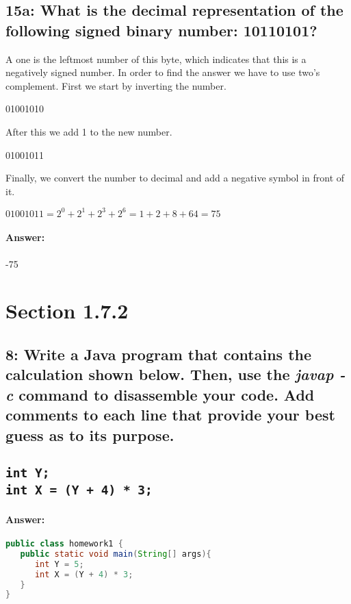 \documentclass[12pt]{article}
\newcommand\tab[1][1cm]{\hspace{#1}}
\begin{document}
\subsection*{15a: What is the decimal representation of the following signed binary number: 10110101?}
\tab A one is the leftmost number of this byte, which indicates that this is a negatively signed number. In order to find the answer we have to use two's complement. First we start by inverting the number. \\
\begin{center}
	01001010
\end{center}
After this we add 1 to the new number.
\begin{center}
	01001011
\end{center}
Finally, we convert the number to decimal and add a negative symbol in front of it. \\
\begin{center}
	$01001011 = 2^0 + 2^1 + 2^3 + 2^6 = 1 + 2 + 8 + 64 = 75$
\end{center}
\paragraph*{Answer:} -75 

\section*{Section 1.7.2}
\subsection*{8: Write a Java program that contains the calculation shown below. Then, use the \textit{javap -c} command to disassemble your code. Add comments to each line that provide your best guess as to its purpose.\\ \\ 
 \tt{int Y;\\
 int X = (Y + 4) * 3;}\\}
\paragraph*{Answer: \\}
\begin{lstlisting}[language=Java, caption=Java Code Written]
public class homework1 {
   public static void main(String[] args){
      int Y = 5;
      int X = (Y + 4) * 3;
   }
}
\end{lstlisting}
\end{document}
